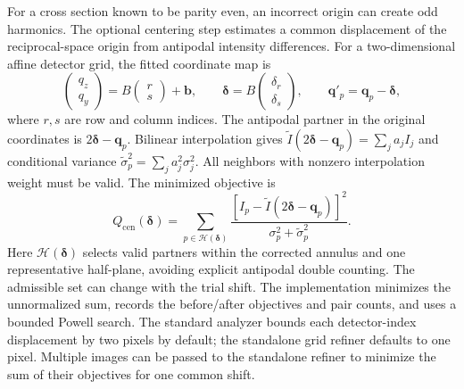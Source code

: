 \documentclass[aps,prb,preprint,onecolumn,notitlepage,amsmath,amssymb,
  superscriptaddress,floatfix]{revtex4-2}
\begin{document}
For a cross section known to be parity even, an incorrect origin can create
odd harmonics. The optional centering step estimates a common displacement
of the reciprocal-space origin from antipodal intensity differences.
For a two-dimensional affine detector grid, the fitted coordinate map is
\begin{equation}
 \begin{pmatrix}q_z\\q_y\end{pmatrix}
 =B\begin{pmatrix}r\\s\end{pmatrix}+\bm b,\qquad
 \bm\delta=B\begin{pmatrix}\delta_r\\\delta_s\end{pmatrix},\qquad
 \bm q'_p=\bm q_p-\bm\delta,
 \label{eq:center-map}
\end{equation}
where $r,s$ are row and column indices. The antipodal partner in the
original coordinates is $2\bm\delta-\bm q_p$. Bilinear interpolation gives
$\widetilde I(2\bm\delta-\bm q_p)=\sum_j a_j I_j$ and conditional variance
$\widetilde\sigma_p^2=\sum_j a_j^2\sigma_j^2$. All neighbors with nonzero
interpolation weight must be valid. The minimized objective is
\begin{equation}
 Q_{\mathrm{cen}}(\bm\delta)=
 \sum_{p\in\mathcal{H}(\bm\delta)}
 \frac{[I_p-\widetilde I(2\bm\delta-\bm q_p)]^2}
      {\sigma_p^2+\widetilde\sigma_p^2}.
 \label{eq:centering-objective}
\end{equation}
Here $\mathcal{H}(\bm\delta)$ selects valid partners within the corrected
annulus and one representative half-plane, avoiding explicit antipodal
double counting. The admissible set can change with the trial shift. The
implementation minimizes the unnormalized sum, records the before/after
objectives and pair counts, and uses a bounded Powell search. The standard
analyzer bounds each detector-index displacement by two pixels by default;
the standalone grid refiner defaults to one pixel. Multiple images can be
passed to the standalone refiner to minimize the sum of their objectives
for one common shift.
\end{document}

